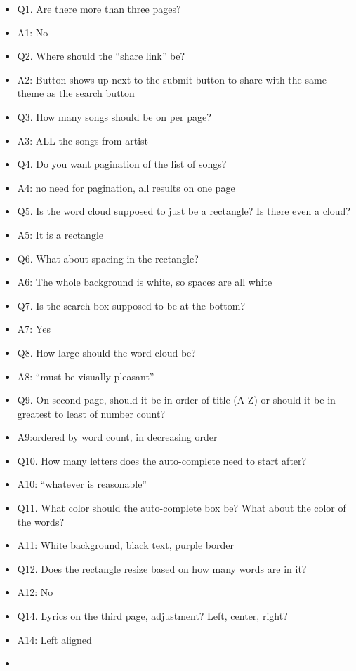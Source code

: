 \documentclass[]{article}
\begin{document}
\begin{itemize}
\itemsep1pt\parskip0pt
\item
  Q1. Are there more than three pages?
\item
  A1: No
\item
  Q2. Where should the ``share link'' be?
\item
  A2: Button shows up next to the submit button to share with the same
  theme as the search button
\item
  Q3. How many songs should be on per page?
\item
  A3: ALL the songs from artist
\item
  Q4. Do you want pagination of the list of songs?
\item
  A4: no need for pagination, all results on one page
\item
  Q5. Is the word cloud supposed to just be a rectangle? Is there even a
  cloud?
\item
  A5: It is a rectangle
\item
  Q6. What about spacing in the rectangle?
\item
  A6: The whole background is white, so spaces are all white
\item
  Q7. Is the search box supposed to be at the bottom?
\item
  A7: Yes
\item
  Q8. How large should the word cloud be?
\item
  A8: ``must be visually pleasant''
\item
  Q9. On second page, should it be in order of title (A-Z) or should it
  be in greatest to least of number count?
\item
  A9:ordered by word count, in decreasing order
\item
  Q10. How many letters does the auto-complete need to start after?
\item
  A10: ``whatever is reasonable''
\item
  Q11. What color should the auto-complete box be? What about the color
  of the words?
\item
  A11: White background, black text, purple border
\item
  Q12. Does the rectangle resize based on how many words are in it?
\item
  A12: No
\item
  Q14. Lyrics on the third page, adjustment? Left, center, right?
\item
  A14: Left aligned
\item

\end{itemize}
\end{document}
